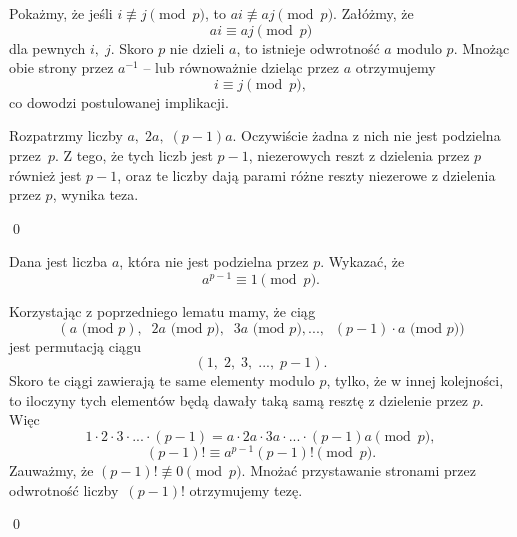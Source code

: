 

\noindent
Pokażmy, że jeśli $i \not\equiv j \pmod{p}$, to $ai \not\equiv aj \pmod{p}$. 
Załóżmy, że 
\[
    ai \equiv aj \pmod{p}
\] 
dla pewnych $i,\; j$. Skoro $p$ nie dzieli $a$, to istnieje odwrotność $a$ modulo $p$. Mnożąc obie strony przez $a^{-1}$ -- lub równoważnie dzieląc przez $a$ otrzymujemy
\[
    i \equiv j \pmod{p},
\]
co dowodzi postulowanej implikacji.

Rozpatrzmy liczby $a, \; 2a,\; (p - 1)a$. Oczywiście żadna z nich nie jest podzielna przez~$p$. Z tego, że tych liczb jest $p - 1$, niezerowych reszt z dzielenia przez $p$ również jest $p - 1$, oraz te liczby dają parami różne reszty niezerowe z dzielenia przez $p$, wynika teza.

\qed


\newpage


\noindent
Dana jest liczba $a$, która nie jest podzielna przez $p$. Wykazać, że
\[
    a^{p - 1} \equiv 1 \pmod{p}.
\]


\noindent
Korzystając z poprzedniego lematu mamy, że ciąg
\[
    (a \text{ (mod } p),\;\; 2a \text{ (mod } p),\;\;  3a \text{ (mod } p), ...,\;\;  (p - 1) \cdot a \text{ (mod } p))
\]
jest permutacją ciągu
\[
 (1,\; 2,\; 3,\; ...,\; p - 1).
\]
Skoro te ciągi zawierają te same elementy modulo $p$, tylko, że w innej kolejności, to iloczyny tych elementów będą dawały taką samą resztę z dzielenie przez $p$. Więc
\[
    1 \cdot 2 \cdot 3 \cdot ... \cdot (p - 1) = a \cdot 2a \cdot 3a \cdot ... \cdot (p - 1)a \pmod{p},
\]
\[
    (p - 1)! \equiv a^{p - 1}(p - 1)! \pmod{p}.
\]
Zauważmy, że $(p - 1)! \not\equiv 0 \pmod{p}$. Mnożać przystawanie stronami przez odwrotność liczby~$(p - 1)!$ otrzymujemy tezę.

\qed

\vspace{10px}
